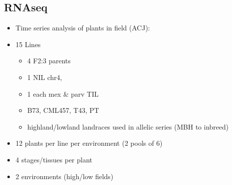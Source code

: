 \subsection{RNAseq} \label{subsec:rnaseq}
\begin{itemize}
\item Time series analysis of plants in field (ACJ):
\item 15 Lines
\begin{itemize}
\item 4 F2:3 parents
\item 1 NIL chr4,
\item 1 each mex \& parv TIL
\item B73, CML457, T43, PT
\item highland/lowland landraces used in allelic series (MBH to inbreed)
\end{itemize}
\item 12 plants per line per environment (2 pools of 6)
\item 4 stages/tissues per plant
\item 2 environments (high/low fields)
\end{itemize}



